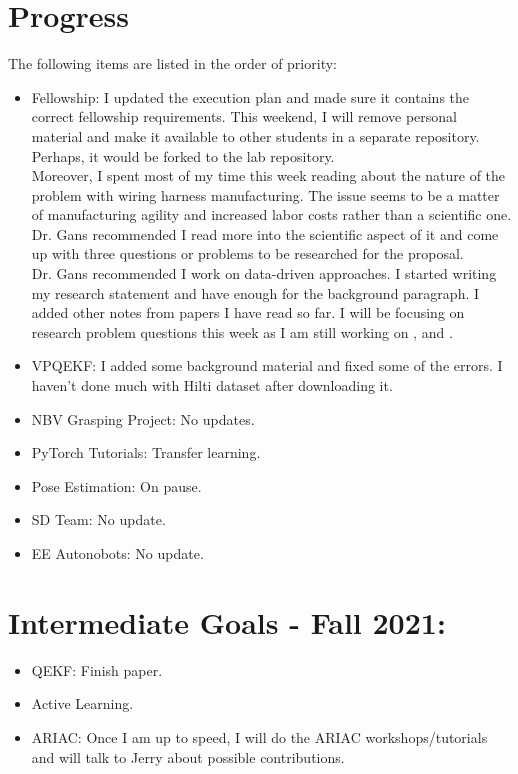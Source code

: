 \documentclass[11pt]{article}
\begin{document}
\section{Progress}
The following items are listed in the order of priority:
\begin{itemize}
      \item Fellowship: I updated the execution plan and made sure it contains the correct fellowship requirements. This weekend, I will remove personal material and make it available to other students in a separate repository. Perhaps, it would be forked to the lab repository.\\
      Moreover, I spent most of my time this week reading about the nature of the problem with wiring harness manufacturing. The issue seems to be a matter of manufacturing agility and increased labor costs rather than a scientific one. Dr. Gans recommended I read more into the scientific aspect of it and come up with three questions or problems to be researched for the proposal. \\
      Dr. Gans recommended I work on data-driven approaches.
      I started writing my research statement and have enough for the background paragraph. I added other notes from papers I have read so far. I will be focusing on research problem questions this week as I am still working on \cite{nguyen2021manufacturing}, \cite{dualMotionERods} and \cite{Quasi-static}.
      \item VPQEKF: I added some background material and fixed some of the errors. I haven't done much with Hilti dataset after downloading it.
      \item NBV Grasping Project: No updates.
      \item PyTorch Tutorials: Transfer learning.
      \item Pose Estimation: On pause.
      \item SD Team: No update.
      \item EE Autonobots: No update.
\end{itemize}


\section{Intermediate Goals - Fall 2021:}
\begin{itemize}
      \item QEKF: Finish paper.
      \item Active Learning.
      \item ARIAC: Once I am up to speed, I will do the ARIAC workshops/tutorials and will talk to Jerry about possible contributions.
\end{itemize}


\newpage


\end{document}
